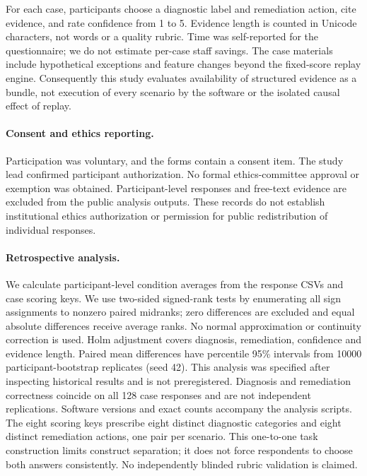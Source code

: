 For each case, participants choose a diagnostic label and remediation action, cite evidence, and rate confidence from 1 to 5. Evidence length is counted in Unicode characters, not words or a quality rubric. Time was self-reported for the questionnaire; we do not estimate per-case staff savings. The case materials include hypothetical exceptions and feature changes beyond the fixed-score replay engine. Consequently this study evaluates availability of structured evidence as a bundle, not execution of every scenario by the software or the isolated causal effect of replay.

\paragraph{Consent and ethics reporting.}
Participation was voluntary, and the forms contain a consent item. The study lead confirmed participant authorization. No formal ethics-committee approval or exemption was obtained. Participant-level responses and free-text evidence are excluded from the public analysis outputs. These records do not establish institutional ethics authorization or permission for public redistribution of individual responses.

\paragraph{Retrospective analysis.}
We calculate participant-level condition averages from the response CSVs and case scoring keys. We use two-sided signed-rank tests by enumerating all sign assignments to nonzero paired midranks; zero differences are excluded and equal absolute differences receive average ranks. No normal approximation or continuity correction is used. Holm adjustment covers diagnosis, remediation, confidence and evidence length. Paired mean differences have percentile 95\% intervals from 10000 participant-bootstrap replicates (seed 42). This analysis was specified after inspecting historical results and is not preregistered. Diagnosis and remediation correctness coincide on all 128 case responses and are not independent replications. Software versions and exact counts accompany the analysis scripts. The eight scoring keys prescribe eight distinct diagnostic categories and eight distinct remediation actions, one pair per scenario. This one-to-one task construction limits construct separation; it does not force respondents to choose both answers consistently. No independently blinded rubric validation is claimed.

